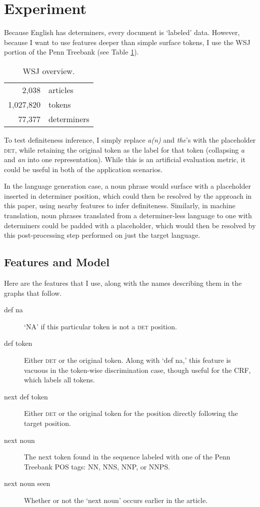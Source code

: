 \documentclass[11pt]{article}\usepackage{graphicx, color}
\begin{document}
\section{Experiment}
Because English has determiners, every document is `labeled' data. However, because I want to use features deeper than simple surface tokens, I use the WSJ portion of the Penn Treebank (see Table \ref{tab:wsjoverview}).
\begin{table}
  \centering
  \begin{tabular}{r@{$\;\,$}l}
    2,038 & articles \\
    1,027,820 & tokens \\
    77,377 & determiners \\
  \end{tabular}
  \caption{WSJ overview.}
  \label{tab:wsjoverview}
\end{table}
\newcommand\detplaceholder{\guillemotleft\textsc{det}\guillemotright}
To test definiteness inference, I simply replace \emph{a(n)} and \emph{the}'s with the placeholder \detplaceholder{}, while retaining the original token as the label for that token (collapsing \emph{a} and \emph{an} into one representation). While this is an artificial evaluation metric, it could be useful in both of the application scenarios.

In the language generation case, a noun phrase would surface with a placeholder inserted in determiner position, which could then be resolved by the approach in this paper, using nearby features to infer definiteness. Similarly, in machine translation, noun phrases translated from a determiner-less language to one with determiners could be padded with a placeholder, which would then be resolved by this post-processing step performed on just the target language.

\subsection{Features and Model}
Here are the features that I use, along with the names describing them in the graphs that follow.
\begin{description}
  \item[def na] `NA' if this particular token is not a \detplaceholder{} position.
  \item[def token] Either \detplaceholder{} or the original token. Along with `def na,' this feature is vacuous in the token-wise discrimination case, though useful for the CRF, which labels all tokens.
  \item[next def token] Either \detplaceholder{} or the original token for the position directly following the target position.
  \item[next noun] The next token found in the sequence labeled with one of the Penn Treebank POS tags: NN, NNS, NNP, or NNPS.
  \item[next noun seen] Whether or not the `next noun' occurs earlier in the article.
\end{description}
\end{document}
